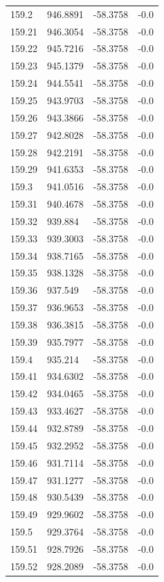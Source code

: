\begin{table}[H]
\begin{tabular}{llll}
159.2 & 946.8891 & -58.3758 & -0.0 \\
159.21 & 946.3054 & -58.3758 & -0.0 \\
159.22 & 945.7216 & -58.3758 & -0.0 \\
159.23 & 945.1379 & -58.3758 & -0.0 \\
159.24 & 944.5541 & -58.3758 & -0.0 \\
159.25 & 943.9703 & -58.3758 & -0.0 \\
159.26 & 943.3866 & -58.3758 & -0.0 \\
159.27 & 942.8028 & -58.3758 & -0.0 \\
159.28 & 942.2191 & -58.3758 & -0.0 \\
159.29 & 941.6353 & -58.3758 & -0.0 \\
159.3 & 941.0516 & -58.3758 & -0.0 \\
159.31 & 940.4678 & -58.3758 & -0.0 \\
159.32 & 939.884 & -58.3758 & -0.0 \\
159.33 & 939.3003 & -58.3758 & -0.0 \\
159.34 & 938.7165 & -58.3758 & -0.0 \\
159.35 & 938.1328 & -58.3758 & -0.0 \\
159.36 & 937.549 & -58.3758 & -0.0 \\
159.37 & 936.9653 & -58.3758 & -0.0 \\
159.38 & 936.3815 & -58.3758 & -0.0 \\
159.39 & 935.7977 & -58.3758 & -0.0 \\
159.4 & 935.214 & -58.3758 & -0.0 \\
159.41 & 934.6302 & -58.3758 & -0.0 \\
159.42 & 934.0465 & -58.3758 & -0.0 \\
159.43 & 933.4627 & -58.3758 & -0.0 \\
159.44 & 932.8789 & -58.3758 & -0.0 \\
159.45 & 932.2952 & -58.3758 & -0.0 \\
159.46 & 931.7114 & -58.3758 & -0.0 \\
159.47 & 931.1277 & -58.3758 & -0.0 \\
159.48 & 930.5439 & -58.3758 & -0.0 \\
159.49 & 929.9602 & -58.3758 & -0.0 \\
159.5 & 929.3764 & -58.3758 & -0.0 \\
159.51 & 928.7926 & -58.3758 & -0.0 \\
159.52 & 928.2089 & -58.3758 & -0.0 \\

\end{tabular}
\end{table}
